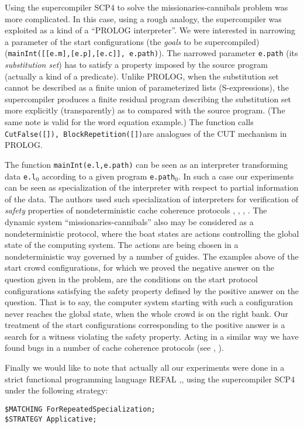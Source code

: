 \documentclass[preprint]{sigplanconf}
\begin{document}
Using the supercompiler SCP4 to solve the missionaries-can\-ni\-bals problem was more complicated. In this case, using a rough analogy, the supercompiler was exploited as a kind of a ``PROLOG interpreter''. We were interested in narrowing a parameter of the start configurations (the \emph{goals} to be supercompiled) (\texttt{mainInt([[e.m],[e.p],[e.c]], e.path)}). The narrowed parameter \texttt{e.path} (its \emph{substitution set}) has to satisfy a property imposed by the source program (actually a kind of a predicate). Unlike PROLOG, when the substitution set cannot be described as a finite union of parameterized lists (S-expressions), the supercompiler produces a finite residual program describing the substitution set more explicitly (transparently) as to compared with the source program. (The same note is valid for the word equation example.)  The function calls \texttt{CutFalse([]), BlockRepetition([])}are analogues of the CUT mechanism in PROLOG. 

The function \texttt{mainInt(e.l,e.path)} can be seen as an interpreter transforming data \texttt{e.l$_0$} according to a given program \texttt{e.path$_0$}. In such a case our experiments can be seen as specialization of the interpreter with respect to partial information of the data. The authors used such specialization of interpreters for verification of \emph{safety} properties of nondeterministic cache coherence protocols \cite{Lis_Nem:Programming}, \cite{Lis_Nem:IJFCS08}, \cite{Lis_Nem:CSR07}, \cite{Lis_Nem:Protocols07}. The dynamic system ``missionaries-cannibals'' also may be considered as a nondeterministic protocol, where the boat states are actions controlling the global state of the computing system. The actions are being chosen in a nondeterministic way governed by a number of guides. The examples above of the start crowd configurations, for which we proved the negative answer on the question given in the problem, are the conditions on the start protocol configurations satisfying the safety property defined by the positive answer on the question. That is to say, the computer system starting with such a configuration never reaches the global state, when the whole crowd is on the right bank. Our treatment of the start configurations corresponding to the positive answer is a search for a witness violating the safety property. Acting in a similar way we have found bugs in a number of cache coherence protocols (see \cite{Lis_Nem:TAP08}, \cite{Lis_Nem:Protocols07}).

{Finally we would like to note that actually all our experiments were done in a strict functional programming language REFAL \cite{Turchin:Refal5},\cite{Refal5:PZ}, using the supercompiler SCP4 under the following strategy:
\noindent
\begin{verbatim}
$MATCHING ForRepeatedSpecialization;
$STRATEGY Applicative;
\end{verbatim}
}
\end{document}
